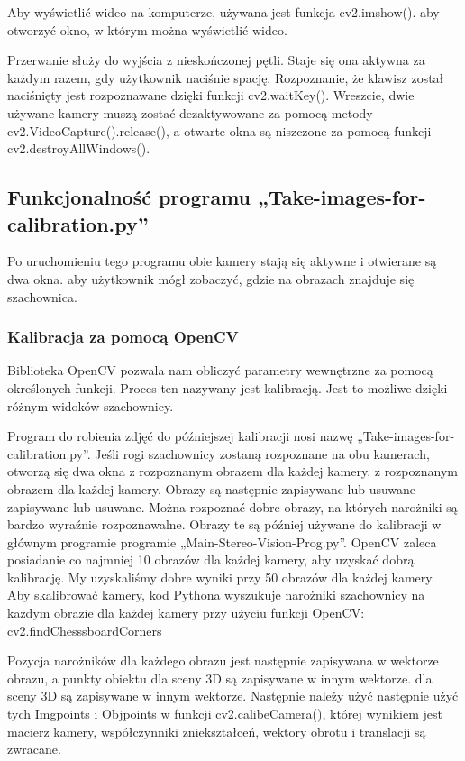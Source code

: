 \documentclass[magisterska]{pracadypl}
\begin{document}
Aby wyświetlić wideo na komputerze, używana jest funkcja cv2.imshow().
aby otworzyć okno, w którym można wyświetlić wideo.

Przerwanie służy do wyjścia z nieskończonej pętli. Staje się ona aktywna
za każdym razem, gdy użytkownik naciśnie spację. Rozpoznanie, że klawisz został naciśnięty
jest rozpoznawane dzięki funkcji cv2.waitKey().
Wreszcie, dwie używane kamery muszą zostać dezaktywowane za pomocą metody
cv2.VideoCapture().release(), a otwarte okna są niszczone za pomocą funkcji
cv2.destroyAllWindows().

\subsection{Funkcjonalność programu „Take-images-for-calibration.py”}

Po uruchomieniu tego programu obie kamery stają się aktywne i otwierane są dwa okna.
aby użytkownik mógł zobaczyć, gdzie na obrazach znajduje się szachownica.


\subsubsection{Kalibracja za pomocą OpenCV}

Biblioteka OpenCV pozwala nam obliczyć parametry wewnętrzne za pomocą określonych funkcji.
Proces ten nazywany jest kalibracją. Jest to możliwe dzięki różnym
widoków szachownicy.

Program do robienia zdjęć do późniejszej kalibracji nosi nazwę
„Take-images-for-calibration.py”.
Jeśli rogi szachownicy zostaną rozpoznane na obu kamerach, otworzą się dwa okna z rozpoznanym obrazem dla każdej kamery.
z rozpoznanym obrazem dla każdej kamery. Obrazy są następnie zapisywane lub usuwane
zapisywane lub usuwane. Można rozpoznać dobre obrazy, na których narożniki
są bardzo wyraźnie rozpoznawalne. Obrazy te są później używane do kalibracji w głównym programie
programie „Main-Stereo-Vision-Prog.py”. OpenCV zaleca posiadanie co najmniej 10
obrazów dla każdej kamery, aby uzyskać dobrą kalibrację. My uzyskaliśmy dobre wyniki przy 50
obrazów dla każdej kamery.
Aby skalibrować kamery, kod Pythona wyszukuje narożniki szachownicy na każdym
obrazie dla każdej kamery przy użyciu funkcji OpenCV: cv2.findChesssboardCorners

Pozycja narożników dla każdego obrazu jest następnie zapisywana w wektorze obrazu, a punkty obiektu dla sceny 3D są zapisywane w innym wektorze.
dla sceny 3D są zapisywane w innym wektorze. Następnie należy użyć
następnie użyć tych Imgpoints i Objpoints w funkcji cv2.calibeCamera(), której wynikiem jest
macierz kamery, współczynniki zniekształceń, wektory obrotu i translacji
są zwracane.
\end{document}
